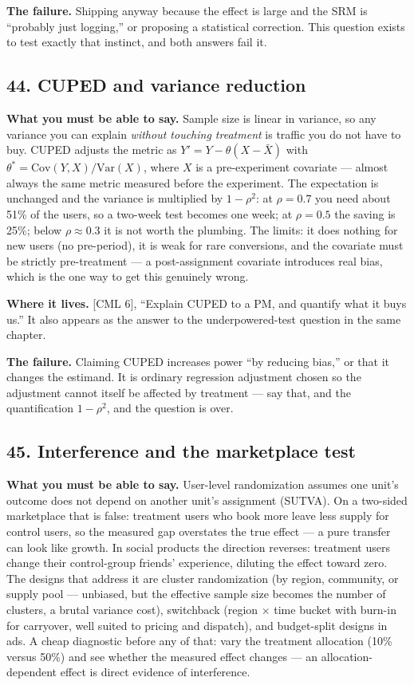 \textbf{The failure.} Shipping anyway because the effect is large and the SRM is ``probably just logging,'' or proposing a statistical correction. This question exists to test exactly that instinct, and both answers fail it.

\subsection*{44. CUPED and variance reduction}

\textbf{What you must be able to say.} Sample size is linear in variance, so any variance you can explain \emph{without touching treatment} is traffic you do not have to buy. CUPED adjusts the metric as $Y' = Y - \theta(X - \bar{X})$ with $\theta^{*} = \mathrm{Cov}(Y,X)/\mathrm{Var}(X)$, where $X$ is a pre-experiment covariate --- almost always the same metric measured before the experiment. The expectation is unchanged and the variance is multiplied by $1 - \rho^2$: at $\rho = 0.7$ you need about 51\% of the users, so a two-week test becomes one week; at $\rho = 0.5$ the saving is 25\%; below $\rho \approx 0.3$ it is not worth the plumbing. The limits: it does nothing for new users (no pre-period), it is weak for rare conversions, and the covariate must be strictly pre-treatment --- a post-assignment covariate introduces real bias, which is the one way to get this genuinely wrong.

\textbf{Where it lives.} [CML 6], ``Explain CUPED to a PM, and quantify what it buys us.'' It also appears as the answer to the underpowered-test question in the same chapter.

\textbf{The failure.} Claiming CUPED increases power ``by reducing bias,'' or that it changes the estimand. It is ordinary regression adjustment chosen so the adjustment cannot itself be affected by treatment --- say that, and the quantification $1 - \rho^2$, and the question is over.

\subsection*{45. Interference and the marketplace test}

\textbf{What you must be able to say.} User-level randomization assumes one unit's outcome does not depend on another unit's assignment (SUTVA). On a two-sided marketplace that is false: treatment users who book more leave less supply for control users, so the measured gap overstates the true effect --- a pure transfer can look like growth. In social products the direction reverses: treatment users change their control-group friends' experience, diluting the effect toward zero. The designs that address it are cluster randomization (by region, community, or supply pool --- unbiased, but the effective sample size becomes the number of clusters, a brutal variance cost), switchback (region $\times$ time bucket with burn-in for carryover, well suited to pricing and dispatch), and budget-split designs in ads. A cheap diagnostic before any of that: vary the treatment allocation (10\% versus 50\%) and see whether the measured effect changes --- an allocation-dependent effect is direct evidence of interference.

